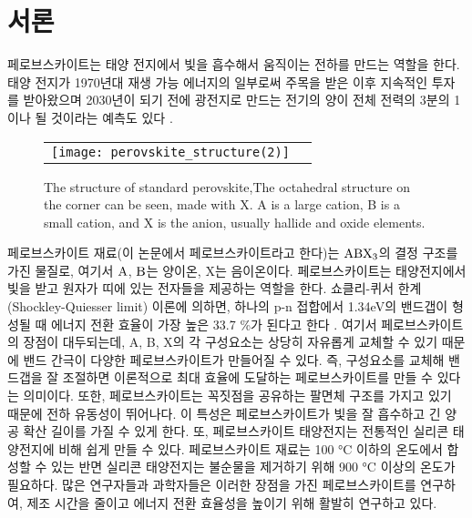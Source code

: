 
\section{서론}

페로브스카이트는 태양 전지에서 빛을 흡수해서 움직이는 전하를 만드는 역할을 한다. 태양 전지가 1970년대 재생 가능 에너지의 일부로써 주목을 받은 이후 지속적인 투자를 받아왔으며 2030년이 되기 전에 광전지로 만드는 전기의 양이 전체 전력의 3분의 1이나 될 것이라는 예측도 있다 \cite{turner2013global}.

\begin{figure}[h!]
	\begin{center}
		\begin{tabular}{cc}
			\texttt{[image: perovskite\_structure(2)]} 
		\end{tabular}
		\caption{The structure of standard perovskite,The octahedral structure on the corner can be seen, made with X. A is a large cation, B is a small cation, and X is the anion, usually hallide and oxide elements.}	
		\label{fig:FIR101}
	\end{center}
\end{figure}

페로브스카이트 재료(이 논문에서 페로브스카이트라고 한다)는 $\rm{ABX_3}$의 결정 구조를 가진 물질로, 여기서 $\rm{A}$, $\rm{B}$는 양이온, X는 음이온이다. 페로브스카이트는 태양전지에서 빛을 받고 원자가 띠에 있는 전자들을 제공하는 역할을 한다. 쇼클리-퀴서 한계(Shockley-Quiesser limit) 이론에 의하면, 하나의 p-n 접합에서 1.34eV의 밴드갭이 형성될 때 에너지 전환 효율이 가장 높은 33.7 \%가 된다고 한다 \cite{ruhle2016tabulated}. 여기서 페로브스카이트의 장점이 대두되는데, A, B, X의 각 구성요소는 상당히 자유롭게 교체할 수 있기 때문에 밴드 간극이  다양한 페로브스카이트가 만들어질 수 있다. 즉, 구성요소를 교체해 밴드갭을 잘 조절하면 이론적으로 최대 효율에 도달하는 페로브스카이트를 만들 수 있다는 의미이다. 또한, 페로브스카이트는 꼭짓점을 공유하는 팔면체 구조를 가지고 있기 때문에 전하 유동성이 뛰어나다\cite{linaburg2015studies}. 이 특성은 페로브스카이트가 빛을 잘 흡수하고 긴 양공 확산 길이를 가질 수 있게 한다\cite{green2014emergence}. 또, 페로브스카이트 태양전지는 전통적인 실리콘 태양전지에 비해 쉽게 만들 수 있다. 페로브스카이트 재료는 100 °C 이하의 온도에서 합성할 수 있는 반면 실리콘 태양전지는 불순물을 제거하기 위해 900 °C 이상의 온도가 필요하다.
많은 연구자들과 과학자들은 이러한 장점을 가진 페로브스카이트를 연구하여, 제조 시간을 줄이고 에너지 전환 효율성을 높이기 위해 활발히 연구하고 있다.

